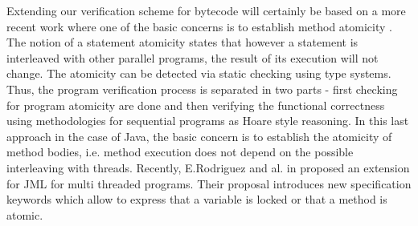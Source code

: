 Extending our verification scheme for bytecode will certainly be based on a more recent work  where one of the basic concerns is to establish method atomicity  \cite{TES03CF}. 
The notion of a statement atomicity states  that however a statement is interleaved with other parallel programs, the result of its execution will not change.
The atomicity can be  detected via static checking \cite{TES03CF} using type systems. Thus, the program verification process is separated in two parts
- first checking for program atomicity  \cite{TES03CF} are done  
and then verifying the functional correctness using  methodologies for sequential programs as Hoare style reasoning. 
In this last approach in the case of Java, the basic concern is to establish the atomicity of method bodies, i.e. method 
execution does not depend on the possible interleaving with threads.
Recently, E.Rodriguez and al. in \cite{RodriguezDFHLR05} proposed an extension for JML for multi threaded
 programs. Their proposal introduces  new specification keywords which allow to express that a variable is locked or
 that a method is atomic.%
 
